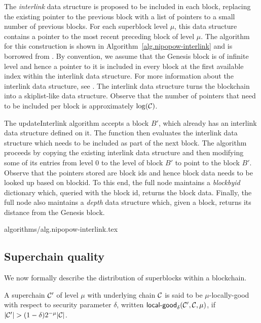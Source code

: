 The \textit{interlink} data structure is proposed to be included in each block,
replacing the existing pointer to the previous block with a list of pointers to
a small number of previous blocks. For each superblock level $\mu$, this data
structure contains a pointer to the most recent preceding block of level
$\mu$. The algorithm for this construction is shown in
Algorithm~\ref{alg.nipopow-interlink} and is borrowed from \cite{KLS}. By
convention, we assume that the Genesis block is of infinite level and hence a
pointer to it is included in every block at the first available index within
the interlink data structure. For more information about the interlink data
structure, see \cite{KLS}. The interlink data structure turns the blockchain
into a skiplist-like data structure. Observe that the number of pointers that
need to be included per block is approximately $\log(\mathcal{C})$.

The updateInterlink algorithm accepts a block $B'$, which already has an
interlink data structure defined on it. The function then evaluates the
interlink data structure which needs to be included as part of the next block.
The algorithm proceeds by copying the existing interlink data structure and
then modifying some of its entries from level $0$ to the level of block $B'$ to
point to the block $B'$. Observe that the pointers stored are block ids and
hence block data needs to be looked up based on blockid. To this end, the full
node maintains a \textit{blockbyid} dictionary which, queried with the block
id, returns the block data. Finally, the full node also maintains a
\textit{depth} data structure which, given a block, returns its distance from
the Genesis block.

{algorithms/alg.nipopow-interlink.tex}

\subsection{Superchain quality}

We now formally describe the distribution of superblocks within a blockchain.

\begin{definition}
A superchain $\mathcal{C}'$ of level
$\mu$ with underlying chain $\mathcal{C}$ is said to be $\mu$-\textnormal{locally-good}
with respect to security parameter $\delta$, written
$\textsf{local-good}_{\delta}(\mathcal{C}', \mathcal{C}, \mu)$, if $|\mathcal{C}'| > (1 -
\delta)2^{-\mu}|\mathcal{C}|$.
\end{definition}


